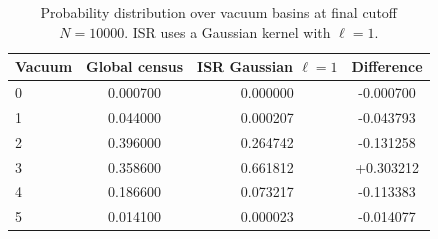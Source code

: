 \begin{table}[t]
  \centering
  \caption{Probability distribution over vacuum basins at final cutoff $N=10000$. ISR uses a Gaussian kernel with $\ell=1$.}
  \label{tab:main_distribution}
  \begin{tabular}{lccc}
    \toprule
    Vacuum & Global census & ISR Gaussian $\ell=1$ & Difference \\
    \midrule
    0 & 0.000700 & 0.000000 & -0.000700 \\
    1 & 0.044000 & 0.000207 & -0.043793 \\
    2 & 0.396000 & 0.264742 & -0.131258 \\
    3 & 0.358600 & 0.661812 & +0.303212 \\
    4 & 0.186600 & 0.073217 & -0.113383 \\
    5 & 0.014100 & 0.000023 & -0.014077 \\
    \bottomrule
  \end{tabular}
\end{table}
